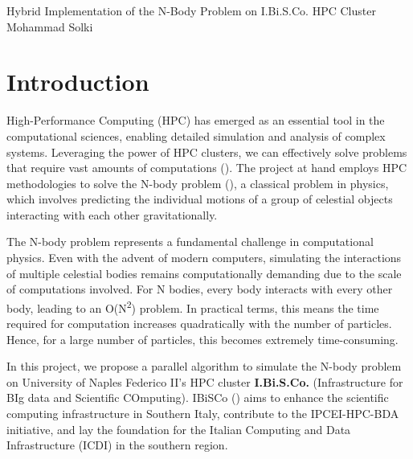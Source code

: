 \documentclass{solutionclass} %
\begin{document}
\pretitle
{Hybrid Implementation of the N-Body Problem} %
{on I.Bi.S.Co. HPC Cluster}        %
{Mohammad Solki}                 %



\section{Introduction}

High-Performance Computing (HPC) has emerged as an essential tool in the computational sciences, enabling detailed simulation and analysis of complex systems. Leveraging the power of HPC clusters, we can effectively solve problems that require vast amounts of computations (\textcite{dongarra2011introduction}). The project at hand employs HPC methodologies to solve the N-body problem (\textcite{aarseth2003gravitational}), a classical problem in physics, which involves predicting the individual motions of a group of celestial objects interacting with each other gravitationally.

The N-body problem represents a fundamental challenge in computational physics. Even with the advent of modern computers, simulating the interactions of multiple celestial bodies remains computationally demanding due to the scale of computations involved. For N bodies, every body interacts with every other body, leading to an O(N\textsuperscript{2}) problem. In practical terms, this means the time required for computation increases quadratically with the number of particles. Hence, for a large number of particles, this becomes extremely time-consuming. 

In this project, we propose a parallel algorithm to simulate the N-body problem on University of Naples Federico II's HPC cluster \textbf{I.Bi.S.Co.} (Infrastructure for BIg data and Scientific COmputing). IBiSCo (\textcite{9872709}) aims to enhance the scientific computing infrastructure in Southern Italy, contribute to the IPCEI-HPC-BDA initiative, and lay the foundation for the Italian Computing and Data Infrastructure (ICDI) in the southern region. 
\end{document}
